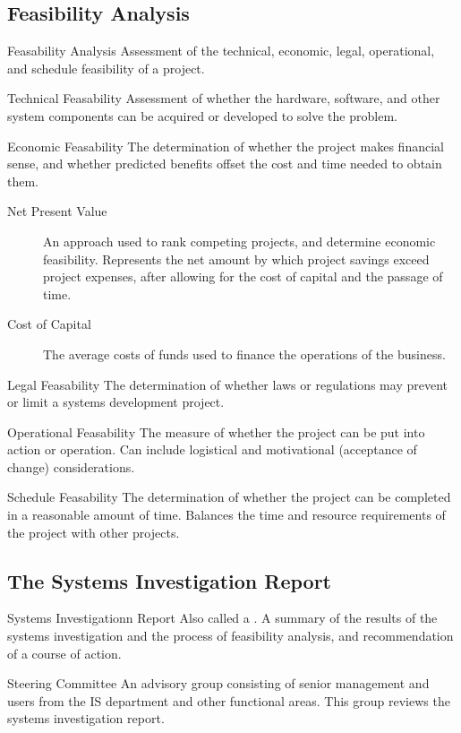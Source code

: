 \documentclass[\main/notes.tex]{subfiles}
\begin{document}
			\subsection{Feasibility Analysis}
				\begin{definition}{Feasability Analysis}
					Assessment of the technical, economic, legal, operational, and schedule feasibility of a project.
				\end{definition}
				\begin{definition}{Technical Feasability}
					Assessment of whether the hardware, software, and other system components can be acquired or developed to solve the problem.
				\end{definition}
				\begin{definition}{Economic Feasability}
					The determination of whether the project makes financial sense, and whether predicted benefits offset the cost and time needed to obtain them.
					\begin{description}
						\item[Net Present Value] An approach used to rank competing projects, and determine economic feasibility. Represents the net amount by which project savings exceed project expenses, after allowing for the cost of capital and the passage of time.
						\item[Cost of Capital] The average costs of funds used to finance the operations of the business.
					\end{description}
				\end{definition}
				\begin{definition}{Legal Feasability}
					The determination of whether laws or regulations may prevent or limit a systems development project.
				\end{definition}
				\begin{definition}{Operational Feasability}
					The measure of whether the project can be put into action or operation. Can include logistical and motivational (acceptance of change) considerations.
				\end{definition}
				\begin{definition}{Schedule Feasability}
					The determination of whether the project can be completed in a reasonable amount of time. Balances the time and resource requirements of the project with other projects.
				\end{definition}
			\subsection{The Systems Investigation Report}
				\begin{definition}{Systems Investigationn Report}
					Also called a . A summary of the results of the systems investigation and the process of feasibility analysis, and recommendation of a course of action.
				\end{definition}
				\begin{definition}{Steering Committee}
					An advisory group consisting of senior management and users from the IS department and other functional areas. This group reviews the systems investigation report.
				\end{definition}

	\vbox{}
\end{document}

